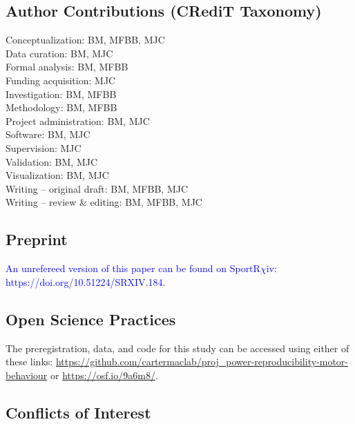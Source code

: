 \documentclass[
  man, donotrepeattitle,mask,floatsintext]{apa7}
\begin{document}
\newpage

\hypertarget{author-contributions-credit-taxonomy}{%
\subsection{Author Contributions (CRediT Taxonomy)}\label{author-contributions-credit-taxonomy}}

\noindent Conceptualization: BM, MFBB, MJC\\
\noindent Data curation: BM, MJC\\
\noindent Formal analysis: BM, MFBB\\
\noindent Funding acquisition: MJC\\
\noindent Investigation: BM, MFBB\\
\noindent Methodology: BM, MFBB\\
\noindent Project administration: BM, MJC\\
\noindent Software: BM, MJC\\
\noindent Supervision: MJC\\
\noindent Validation: BM, MJC\\
\noindent Visualization: BM, MJC\\
\noindent Writing -- original draft: BM, MFBB, MJC\\
\noindent Writing -- review \& editing: BM, MFBB, MJC

\hypertarget{preprint}{%
\subsection{Preprint}\label{preprint}}

\noindent \textcolor{blue}{An unrefereed version of this paper can be found on SportR$\chi$iv: https://doi.org/10.51224/SRXIV.184}.

\hypertarget{open-science-practices}{%
\subsection{Open Science Practices}\label{open-science-practices}}

\noindent The preregistration, data, and code for this study can be accessed using either of these links: \url{https://github.com/cartermaclab/proj_power-reproducibility-motor-behaviour} or \url{https://osf.io/9a6m8/}.

\hypertarget{conflicts-of-interest}{%
\subsection{Conflicts of Interest}\label{conflicts-of-interest}}
\end{document}
